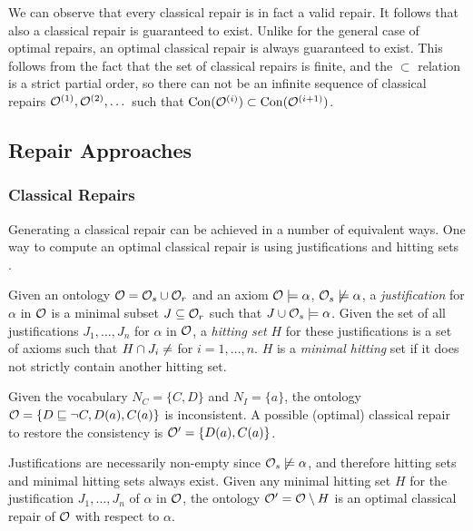 We can observe that every classical repair is in fact a valid repair. It follows that also a classical repair is guaranteed to exist. Unlike for the general case of optimal repairs, an optimal classical repair is always guaranteed to exist. This follows from the fact that the set of classical repairs is finite, and the $\subset$ relation is a strict partial order, so there can not be an infinite sequence of classical repairs $\mathcal{O}^{(1)}, \mathcal{O}^{(2)}, \dots$  such that $\mathrm{Con}(\mathcal{O}^{(i)}) \subset \mathrm{Con}(\mathcal{O}^{(i + 1)})$.

\subsection{Repair Approaches} \label{repair-approaches}

\subsubsection{Classical Repairs} \label{classical-repairs}

Generating a classical repair can be achieved in a number of equivalent ways. One way to compute an optimal classical repair is using justifications and hitting sets \cite{reiter1987theory}.

\begin{definition}
Given an ontology $\mathcal{O} = \mathcal{O}_s \cup \mathcal{O}_r$ and an axiom $\mathcal{O} \models \alpha$, $\mathcal{O}_s \not\models \alpha$, a \emph{justification} for $\alpha$ in $\mathcal{O}$ is a minimal subset $J \subseteq \mathcal{O}_r$ such that $J \cup \mathcal{O}_s \models \alpha$. Given the set of all justifications $J_1, \dots, J_n$ for $\alpha$ in $\mathcal{O}$, a \emph{hitting set} $H$ for these justifications is a set of axioms such that $H \cap J_i \not= \empty$ for $i = 1, \dots, n$. $H$ is a \emph{minimal hitting} set if it does not strictly contain another hitting set.
\end{definition}

\begin{example}
Given the vocabulary $N_C = \{ C, D \}$ and $N_I = \{ a \}$, the ontology $\mathcal{O} = \{ D \sqsubseteq \lnot C, D(a), C(a) \}$ is inconsistent. A possible (optimal) classical repair to restore the consistency is $\mathcal{O}' = \{ D(a), C(a) \}$.
\end{example}

Justifications are necessarily non-empty since $\mathcal{O}_s \not\models \alpha$, and therefore hitting sets and minimal hitting sets always exist. Given any minimal hitting set $H$ for the justification $J_1, \dots, J_n$ of $\alpha$ in $\mathcal{O}$, the ontology $\mathcal{O}' = \mathcal{O} \setminus H$ is an optimal classical repair of $\mathcal{O}$ with respect to $\alpha$.


